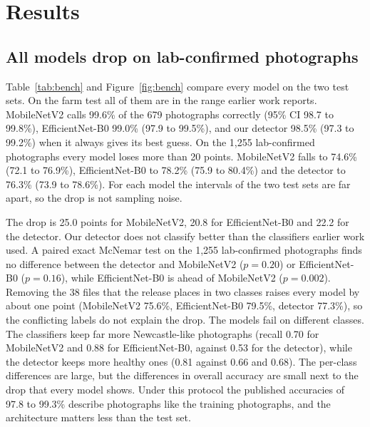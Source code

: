 \section{Results}
\label{sec:results}

\subsection{All models drop on lab-confirmed photographs}
\label{sec:res-bench}

Table~\ref{tab:bench} and Figure~\ref{fig:bench} compare every model on the two test sets. On the farm test all of
them are in the range earlier work reports. MobileNetV2 calls 99.6\% of the 679 photographs correctly (95\% CI 98.7 to
99.8\%), EfficientNet-B0 99.0\% (97.9 to 99.5\%), and our detector 98.5\% (97.3 to 99.2\%) when it always gives its
best guess. On the 1,255 lab-confirmed photographs every model loses more than 20 points. MobileNetV2 falls to 74.6\%
(72.1 to 76.9\%), EfficientNet-B0 to 78.2\% (75.9 to 80.4\%) and the detector to 76.3\% (73.9 to 78.6\%). For each
model the intervals of the two test sets are far apart, so the drop is not sampling noise.

The drop is 25.0 points for MobileNetV2, 20.8 for EfficientNet-B0 and 22.2 for the detector. Our detector does not
classify better than the classifiers earlier work used. A paired exact McNemar test on the 1,255 lab-confirmed
photographs finds no difference between the detector and MobileNetV2 ($p=0.20$) or EfficientNet-B0 ($p=0.16$), while
EfficientNet-B0 is ahead of MobileNetV2 ($p=0.002$). Removing the 38 files that the release places in two classes
raises every model by about one point (MobileNetV2 75.6\%, EfficientNet-B0 79.5\%, detector 77.3\%), so the conflicting
labels do not explain the drop. The models fail on different classes. The classifiers keep far more Newcastle-like photographs (recall 0.70 for MobileNetV2 and 0.88 for
EfficientNet-B0, against 0.53 for the detector), while the detector keeps more healthy ones (0.81 against 0.66 and
0.68). The per-class differences are large, but the differences in overall accuracy are small next to the drop
that every model shows. Under this protocol the published
accuracies of 97.8 to 99.3\% describe photographs like the training photographs, and the architecture matters less than the test set.

